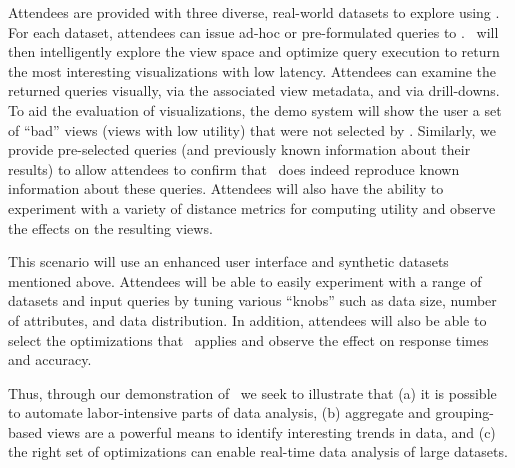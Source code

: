  Attendees are provided with three
diverse, real-world datasets to explore using \SeeDB. For each dataset,
attendees can issue ad-hoc or pre-formulated queries to \SeeDB. \SeeDB\ will
then intelligently explore the view space and optimize query execution to return the
most interesting visualizations with low latency. Attendees can examine the
returned queries visually, via the associated view metadata, and via
drill-downs. To aid the evaluation of visualizations, the demo system will show
the user a set of ``bad'' views (views with low utility) that were not selected
by \SeeDB.
Similarly, we provide pre-selected queries (and
previously known information about their results) to allow attendees to
confirm that \SeeDB\ does indeed reproduce known information about these
queries. Attendees will also have the ability to experiment with a
variety of distance metrics for computing utility and observe the effects on the
resulting views.


 This scenario
will use an enhanced user interface and synthetic datasets mentioned above.
Attendees will be able to easily experiment with a range of datasets and input
queries by tuning various ``knobs'' such as data size, number of attributes, and
data distribution. In addition, attendees will also be able to select the
optimizations that \SeeDB\ applies and observe the effect on response times and
accuracy.

Thus, through our demonstration of \SeeDB\, we seek to illustrate that (a) it is
possible to automate labor-intensive parts of data analysis, (b) aggregate
and grouping-based views are a powerful means to identify interesting trends
in data, and (c) the right set of optimizations can enable real-time data
analysis of large datasets.

